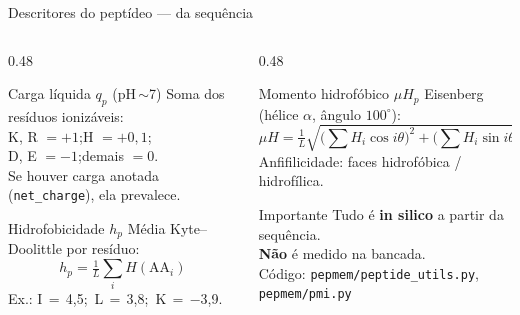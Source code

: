 \documentclass[aspectratio=169,10pt]{beamer}
\begin{document}
\begin{frame}{Descritores do peptídeo --- da sequência}
\begin{columns}[T]
\begin{column}{0.48\textwidth}
\begin{block}{Carga líquida $q_p$ (pH\,$\sim$7)}
Soma dos resíduos ionizáveis:\\[0.1cm]
K, R $= +1$;\quad H $= +0{,}1$;\\
D, E $= -1$;\quad demais $= 0$.\\[0.15cm]
{\scriptsize Se houver carga anotada (\texttt{net\_charge}), ela prevalece.}
\end{block}
\vspace{0.2cm}
\begin{block}{Hidrofobicidade $h_p$}
Média Kyte--Doolittle por resíduo:
\[
h_p = \tfrac{1}{L}\sum_i H(\mathrm{AA}_i)
\]
{\scriptsize Ex.: I\,$=$\,4,5;\, L\,$=$\,3,8;\, K\,$=$\,$-$3,9.}
\end{block}
\end{column}
\begin{column}{0.48\textwidth}
\begin{block}{Momento hidrofóbico $\mu H_p$}
Eisenberg (hélice $\alpha$, ângulo $100^\circ$):
\[
\mu H = \tfrac{1}{L}\sqrt{
\big(\!\sum H_i\cos i\theta\big)^2
\!+\!
\big(\!\sum H_i\sin i\theta\big)^2}
\]
{\scriptsize Anfifilicidade: faces hidro\-fóbica / hidrofílica.}
\end{block}
\vspace{0.2cm}
\begin{block}{Importante}
Tudo é \textbf{in silico} a partir da sequência.\\
\textbf{Não} é medido na bancada.\\
{\scriptsize Código: \texttt{pepmem/peptide\_utils.py}, \texttt{pepmem/pmi.py}}
\end{block}
\end{column}
\end{columns}
\end{frame}
\end{document}
